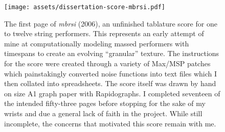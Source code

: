 \begin{figure}[H]
\begin{centering}
\texttt{[image: assets/dissertation-score-mbrsi.pdf]}
\caption{The first page of \emph{mbrsi} (2006), an unfinished tablature score
for one to twelve string performers. This represents an early attempt of mine
at computationally modeling massed performers with timespans to create an
evolving \enquote{granular} texture. The instructions for the score were
created through a variety of Max/MSP patches which painstakingly converted
noise functions into text files which I then collated into spreadsheets. The
score itself was drawn by hand on size A1 graph paper with Rapidographs.
I completed seventeen of the intended fifty-three pages before stopping for the
sake of my wrists and due a general lack of faith in the project. While still
incomplete, the concerns that motivated this score remain with me.}
\label{fig:mbrsi-score}
\end{centering} 
\end{figure}

\begin{figure}[H]
\end{figure}

